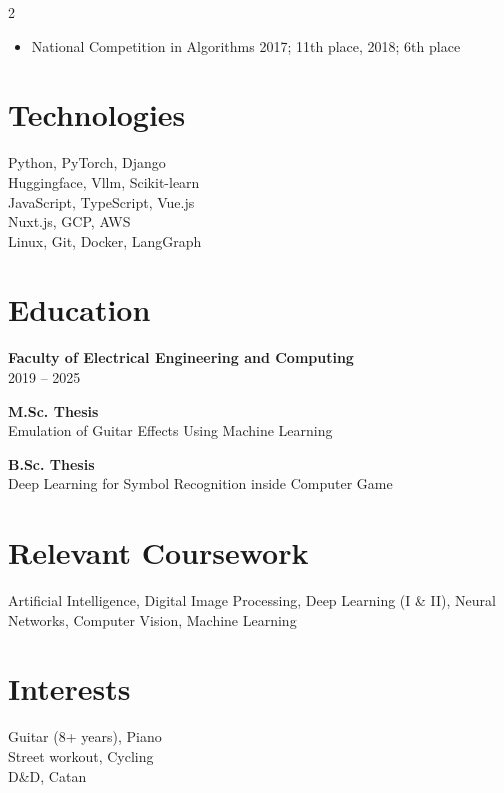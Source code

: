 \documentclass[a4paper,10pt]{article}
\begin{document}
\begin{paracol}{2}
\begin{itemize}
    \item National Competition in Algorithms 2017; 11th place, 2018; 6th place

\end{itemize}

\switchcolumn

\section*{Technologies}
\color{midgray}
Python, PyTorch, Django \\
Huggingface, Vllm, Scikit-learn \\
JavaScript, TypeScript, Vue.js \\
Nuxt.js, GCP, AWS \\
Linux, Git, Docker, LangGraph \\

\vspace{4mm}

\section*{Education}
\color{midgray}
\textbf{Faculty of Electrical Engineering and Computing} \\
2019 -- 2025

\vspace{2mm}
\textbf{M.Sc. Thesis} \\
Emulation of Guitar Effects Using Machine Learning

\vspace{2mm}
\textbf{B.Sc. Thesis} \\
Deep Learning for Symbol Recognition inside Computer Game

\vspace{2mm}
\section*{Relevant Coursework}
Artificial Intelligence, Digital Image Processing, Deep Learning (I \& II), Neural Networks, Computer Vision, Machine Learning

\vspace{4mm}

\section*{Interests}
\color{midgray}
Guitar (8+ years), Piano \\
Street workout, Cycling \\
D\&D, Catan

\end{paracol}
\end{document}
